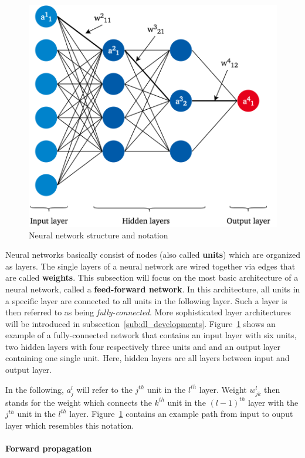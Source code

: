 \begin{figure}[h]
  \includegraphics[height=10cm]{img/nn_architecture_2}
  \caption{Neural network structure and notation}
\label{fig:nn_architecture}
\end{figure}

Neural networks basically consist of nodes (also called \textbf{units}) which
are organized as layers.
The single layers of a neural network are wired together via edges that are
called \textbf{weights}.
This subsection will focus on the most basic architecture of a neural network,
called a \textbf{feed-forward network}.
In this architecture, all units in a specific layer are connected to all units
in the following layer.
Such a layer is then referred to as being \textit{fully-connected}.
More sophisticated layer architectures will be introduced in subsection~\ref{sub:dl_developments}.
Figure~\ref{fig:nn_architecture} shows an example of a fully-connected network
that contains an input layer with six units, two hidden layers with four respectively
three units and and an output layer containing one single unit.
Here, hidden layers are all layers between input and output layer.

In the following, $a_j^l$ will refer to the $j^{th}$ unit in the $l^{th}$ layer.
Weight $w_{jk}^l$ then stands for the weight which connects the $k^{th}$ unit in
the ${(l-1)}^{th}$ layer with the $j^{th}$ unit in the $l^{th}$ layer.
Figure~\ref{fig:nn_architecture} contains an example path from input to ouput
layer which resembles this notation.

\paragraph{Forward propagation}
\label{sub:dl_forward}

